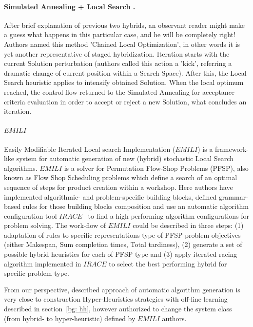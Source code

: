 \paragraph{Simulated Annealing + Local Search \cite{martin1996combining}.}
After brief explanation of previous two hybrids, an observant reader might make a guess what happens in this particular case, and he will be completely right!
Authors named this method 'Chained Local Optimization', in other words it is yet another representative of staged hybridization. Iteration starts with the current Solution perturbation (authors called this action a 'kick', referring a dramatic change of current position within a Search Space). After this, the Local Search heuristic applies to intensify obtained Solution. When the local optimum reached, the control flow returned to the Simulated Annealing for acceptance criteria evaluation in order to accept or reject a new Solution, what concludes an iteration.


\paragraph{$EMILI$~\cite{pagnozzi2019automatic}} 
Easily Modifiable Iterated Local search Implementation ($EMILI$) is a framework-like system for automatic generation of new (hybrid) stochastic Local Search algorithms. $EMILI$ is a solver for Permutation Flow-Shop Problems (PFSP), also known as Flow Shop Scheduling problems which define a search of an optimal sequence of steps for product creation within a workshop.
Here authors have implemented algorithmic- and problem-specific building blocks, defined grammar-based rules for those building blocks composition and use an automatic algorithm configuration tool $IRACE$~\cite{lopez2016irace} to find a high performing algorithm configurations for problem solving. The work-flow of $EMILI$ could be described in three steps: (1) adaptation of rules to specific representations type of PFSP problem objectives (either Makespan, Sum completion times, Total tardiness), (2) generate a set of possible hybrid heuristics for each of PFSP type and (3) apply iterated racing algorithm implemented in $IRACE$ to select the best performing hybrid for specific problem type. 

From our perspective, described approach of automatic algorithm generation is very close to construction Hyper-Heuristics strategies with off-line learning described in section~\ref{bg: hh}, however authorized to change the system class (from hybrid- to hyper-heuristic) defined by $EMILI$ authors.



